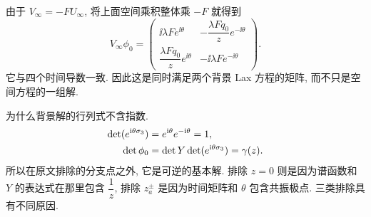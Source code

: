 由于 $V_\infty=-FU_\infty$, 将上面空间乘积整体乘 $-F$ 就得到
\begin{equation*}
V_\infty\phi_0=
\begin{pmatrix}
\ii\lambda F e^{\ii\theta}
&-\dfrac{\lambda Fq_0}{z}e^{-\ii\theta}\\
\dfrac{\lambda Fq_0}{z}e^{\ii\theta}
&-\ii\lambda F e^{-\ii\theta}
\end{pmatrix}.
\end{equation*}
它与四个时间导数一致. 因此这是同时满足两个背景 Lax 方程的矩阵, 而不只是空间方程的一组解.
\par\smallskip\noindent 为什么背景解的行列式不含指数.\quad
\begin{align*}
\det(e^{\mathrm{i}\theta\sigma_3})
&=e^{\mathrm{i}\theta}e^{-\mathrm{i}\theta}=1,\\
\det\phi_0
&=\det Y\det(e^{\mathrm{i}\theta\sigma_3})
=\gamma(z).
\end{align*}
所以在原文排除的分支点之外, 它是可逆的基本解. 排除 $z=0$ 则是因为谱函数和 $Y$ 的表达式在那里包含 $\dfrac{1}{z}$, 排除 $z_a^\pm$ 是因为时间矩阵和 $\theta$ 包含共振极点. 三类排除具有不同原因.


